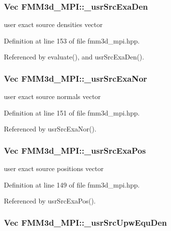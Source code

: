 \subsubsection{\setlength{\rightskip}{0pt plus 5cm}Vec {\bf FMM3d\_\-MPI::\_\-usr\-Src\-Exa\-Den}\hspace{0.3cm}{\tt  [protected]}}\label{classFMM3d__MPI_baa2aff9296ce47ba175061601d9d984_baa2aff9296ce47ba175061601d9d984}


user exact source densities vector 

Definition at line 153 of file fmm3d\_\-mpi.hpp.

Referenced by evaluate(), and usr\-Src\-Exa\-Den().
\subsubsection{\setlength{\rightskip}{0pt plus 5cm}Vec {\bf FMM3d\_\-MPI::\_\-usr\-Src\-Exa\-Nor}\hspace{0.3cm}{\tt  [protected]}}\label{classFMM3d__MPI_819fe5324f86afc831260b376aef4a76_819fe5324f86afc831260b376aef4a76}


user exact source normals vector 

Definition at line 151 of file fmm3d\_\-mpi.hpp.

Referenced by usr\-Src\-Exa\-Nor().
\subsubsection{\setlength{\rightskip}{0pt plus 5cm}Vec {\bf FMM3d\_\-MPI::\_\-usr\-Src\-Exa\-Pos}\hspace{0.3cm}{\tt  [protected]}}\label{classFMM3d__MPI_812bb4ffefcc27f7594cc305f84fa449_812bb4ffefcc27f7594cc305f84fa449}


user exact source positions vector 

Definition at line 149 of file fmm3d\_\-mpi.hpp.

Referenced by usr\-Src\-Exa\-Pos().
\subsubsection{\setlength{\rightskip}{0pt plus 5cm}Vec {\bf FMM3d\_\-MPI::\_\-usr\-Src\-Upw\-Equ\-Den}\hspace{0.3cm}{\tt  [protected]}}\label{classFMM3d__MPI_67ce9fea8d214e0afd15ab60ec29917d_67ce9fea8d214e0afd15ab60ec29917d}


